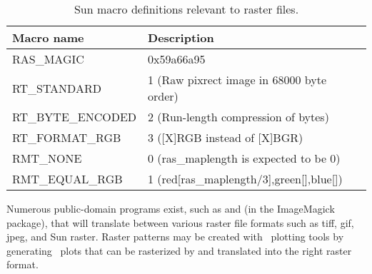 \begin{table}[H]
\centering
\begin{tabular}{ll} \hline
\textbf{Macro name}} & \textbf{Description}} \\ \hline\hline
RAS\_MAGIC & 0x59a66a95 \\
RT\_STANDARD & 1 (Raw pixrect image in 68000 byte order) \\
RT\_BYTE\_ENCODED & 2 (Run-length compression of bytes) \\
RT\_FORMAT\_RGB & 3 ([X]RGB instead of [X]BGR) \\
RMT\_NONE & 0 (ras\_maplength is expected to be 0) \\
RMT\_EQUAL\_RGB & 1 (red[ras\_maplength/3],green[],blue[]) \\ \hline
\end{tabular}

\caption{Sun macro definitions relevant to raster files.}
\label{tbl:sundef}
\end{table}

Numerous public-domain programs exist, such as  and
 (in the ImageMagick package), that will translate
between various raster file formats such as tiff, gif, jpeg, and
Sun raster.  Raster patterns may be created with \GMT\ plotting
tools by generating \PS\ plots that can be rasterized
by  and translated into the right raster format.
